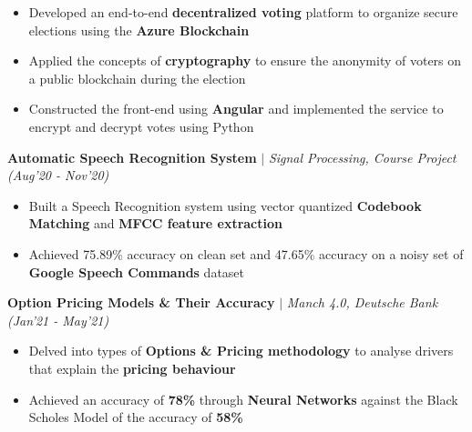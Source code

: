 \documentclass[10pt]{article}
\begin{document}
	\begin{itemize}[label={\textbullet},itemsep = -1 mm, leftmargin=*]
     \item Developed an end-to-end \textbf{decentralized voting} platform to organize secure elections using the \textbf{Azure Blockchain}
     \item Applied the concepts of \textbf{cryptography} to ensure the anonymity of voters on a public blockchain during the election
     \item Constructed the front-end using \textbf{Angular} and implemented the service to encrypt and decrypt votes using Python 
\end{itemize}
\vspace{-6pt}
    \textbf{Automatic Speech Recognition System} $|$  \textit{Signal Processing, Course Project} \hfill{\sl \small (Aug'20 - Nov’20)} \\
    \vspace{-0.3cm}
    \hline 
    \vspace{-2pt}    
\begin{itemize}[label={\textbullet},itemsep = -1 mm, leftmargin=*]
   \item Built a Speech Recognition system using vector quantized \textbf{Codebook Matching} and \textbf{MFCC feature extraction}
    \item Achieved 75.89\% accuracy on clean set and 47.65\% accuracy on a noisy set of \textbf{Google Speech Commands} dataset
\end{itemize}
\vspace{-6pt}
\textbf{Option Pricing Models \& Their Accuracy} $|$  \textit{Manch 4.0, Deutsche Bank} \hfill{\sl \small (Jan’21 - May’21)} \\
    \vspace{-0.3cm}
    \hline 
    \vspace{-2pt}    
\begin{itemize}[label={\textbullet},itemsep = -1 mm, leftmargin=*]
    \item Delved into types of \textbf{Options \& Pricing methodology} to analyse drivers that explain the \textbf{pricing behaviour} 
    \item Achieved an accuracy of \textbf{78\%} through \textbf{Neural Networks} against the Black Scholes Model of the accuracy of \textbf{58\%}
\end{itemize}
\end{document}
